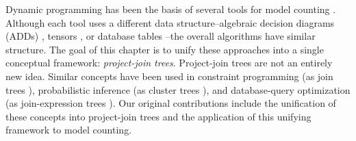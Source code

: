 

Dynamic programming has been the basis of several tools for model counting \cite{DPV20,DDV19,dudek2020parallel,fichte2020exploiting}.
Although each tool uses a different data structure--algebraic decision diagrams (ADDs) \cite{DPV20}, tensors \cite{DDV19,dudek2020parallel}, or database tables \cite{fichte2020exploiting}--the overall algorithms have similar structure.
The goal of this chapter is to unify these approaches into a single conceptual framework: \emph{project-join trees}.
Project-join trees are not an entirely new idea.
Similar concepts have been used in constraint programming (as join trees \cite{dechter1989tree}), probabilistic inference (as cluster trees \cite{SAS94}), and database-query optimization (as join-expression trees \cite{MPPV04}).
Our original contributions include the unification of these concepts into project-join trees and the application of this unifying framework to model counting.

